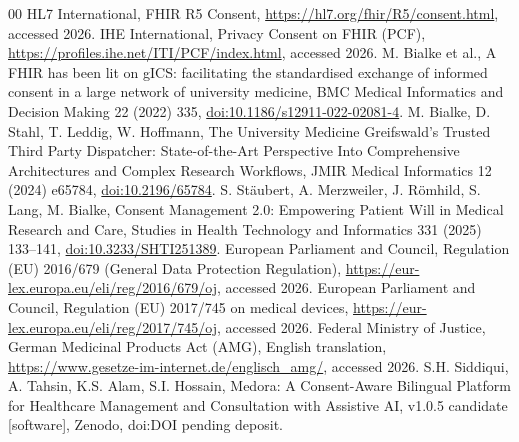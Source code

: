 \documentclass[preprint,12pt,a4paper]{elsarticle}
\newcommand{\ReleaseVersion}{v1.0.5 candidate}
\newcommand{\ReleaseDOI}{DOI pending deposit}
\begin{document}
\begin{thebibliography}{00}
 HL7 International, FHIR R5 Consent, \url{https://hl7.org/fhir/R5/consent.html}, accessed 2026.
 IHE International, Privacy Consent on FHIR (PCF), \url{https://profiles.ihe.net/ITI/PCF/index.html}, accessed 2026.
 M. Bialke et al., A FHIR has been lit on gICS: facilitating the standardised exchange of informed consent in a large network of university medicine, BMC Medical Informatics and Decision Making 22 (2022) 335, \href{https://doi.org/10.1186/s12911-022-02081-4}{doi:10.1186/s12911-022-02081-4}.
 M. Bialke, D. Stahl, T. Leddig, W. Hoffmann, The University Medicine Greifswald's Trusted Third Party Dispatcher: State-of-the-Art Perspective Into Comprehensive Architectures and Complex Research Workflows, JMIR Medical Informatics 12 (2024) e65784, \href{https://doi.org/10.2196/65784}{doi:10.2196/65784}.
 S. St\"aubert, A. Merzweiler, J. R\"omhild, S. Lang, M. Bialke, Consent Management 2.0: Empowering Patient Will in Medical Research and Care, Studies in Health Technology and Informatics 331 (2025) 133--141, \href{https://doi.org/10.3233/SHTI251389}{doi:10.3233/SHTI251389}.
 European Parliament and Council, Regulation (EU) 2016/679 (General Data Protection Regulation), \url{https://eur-lex.europa.eu/eli/reg/2016/679/oj}, accessed 2026.
 European Parliament and Council, Regulation (EU) 2017/745 on medical devices, \url{https://eur-lex.europa.eu/eli/reg/2017/745/oj}, accessed 2026.
 Federal Ministry of Justice, German Medicinal Products Act (AMG), English translation, \url{https://www.gesetze-im-internet.de/englisch_amg/}, accessed 2026.
 S.H. Siddiqui, A. Tahsin, K.S. Alam, S.I. Hossain, Medora: A Consent-Aware Bilingual Platform for Healthcare Management and Consultation with Assistive AI, \ReleaseVersion{} [software], Zenodo, doi:\ReleaseDOI.

\end{thebibliography}
\end{document}
